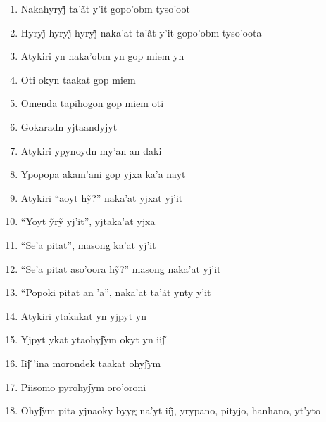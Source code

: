 \begin{enumerate}
 \item Nakahyryj̃ ta’ãt y’it gopo’obm tyso’oot

 \item Hyryj̃ hyryj̃ hyryj̃ naka’at ta’ãt y’it gopo’obm tyso’oota

 \begin{center}\end{center}

 \item Atykiri yn naka'obm yn gop miem yn

 \item Oti okyn taakat gop miem

 \item Omenda tapihogon gop miem oti

 \item Gokaradn yjtaandyjyt

 \item Atykiri ypynoydn my'an an daki

 \item Ypopopa akam'ani gop yjxa ka'a nayt

 \begin{center}\end{center}

 \item Atykiri ``aoyt hỹ?'' naka’at yjxat yj’it

 \item ``Yoyt ỹrỹ yj’it'', yjtaka’at yjxa

 \item ``Se'a pitat'', masong ka'at yj'it

 \item ``Se’a pitat aso’oora hỹ?'' masong naka’at yj’it

 \item ``Popoki pitat an 'a'', naka'at ta'ãt ynty y'it

 \begin{center}\end{center}

 \item Atykiri ytakakat yn yjpyt yn

 \item Yjpyt ykat ytaohyj͂ym okyt yn iij͂

 \item Iij͂ 'ina morondek taakat ohyj͂ym

 \item Piisomo pyrohyj͂ym oro'oroni

 \item Ohyj͂ym pita yjnaoky byyg na’yt iij̃, yrypano, pityjo, hanhano, yt’yto


\end{enumerate}
